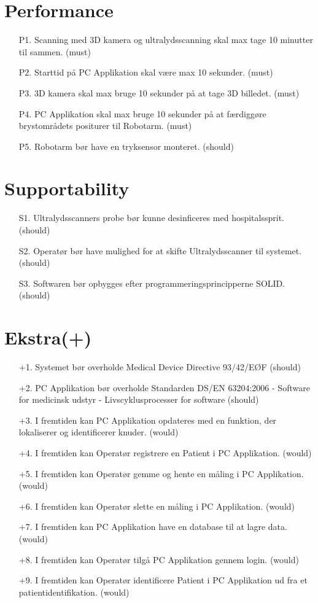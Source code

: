 \section{Performance}
\begin{enumerate}
    \item[P1.] Scanning med 3D kamera og ultralydsscanning skal max tage 10 minutter til sammen. (must) 
    \item[P2.] Starttid på PC Applikation skal være max 10 sekunder. (must)
    \item[P3.] 3D kamera skal max bruge 10 sekunder på at tage 3D billedet. (must)
    \item[P4.] PC Applikation skal max bruge 10 sekunder på at færdiggøre brystområdets positurer til Robotarm. (must)
    \item[P5.] Robotarm bør have en tryksensor monteret. (should)
\end{enumerate}

\section{Supportability}
\begin{enumerate}
    \item[S1.] Ultralydsscanners probe bør kunne desinficeres med hospitalssprit. (should)
    \item[S2.] Operatør bør have mulighed for at skifte Ultralydsscanner til systemet. (should)
    \item[S3.] Softwaren bør opbygges efter programmeringsprincipperne SOLID. (should)
\end{enumerate}
\section{Ekstra(+)}\label{andrePlus}

\begin{enumerate}
	\item[+1.] Systemet bør overholde Medical Device Directive 93/42/EØF \cite{MDD} (should)
	\item[+2.] PC Applikation bør overholde Standarden DS/EN 63204:2006 - Software for medicinsk udstyr - Livscyklusprocesser for software \cite{software} (should)
    \item[+3.] I fremtiden kan PC Applikation opdateres med en funktion, der lokaliserer og identificerer knuder. (would)
    \item[+4.] I fremtiden kan Operatør registrere en Patient i PC Applikation. (would) 
    \item[+5.] I fremtiden kan Operatør gemme og hente en måling i PC Applikation. (would)  
    \item[+6.] I fremtiden kan Operatør slette en måling i PC Applikation. (would)
    \item[+7.] I fremtiden kan PC Applikation have en database til at lagre data. (would)
    \item[+8.] I fremtiden kan Operatør tilgå PC Applikation gennem login. (would) 
    \item[+9.] I fremtiden kan Operatør identificere Patient i PC Applikation ud fra et patientidentifikation. (would)
\end{enumerate}
